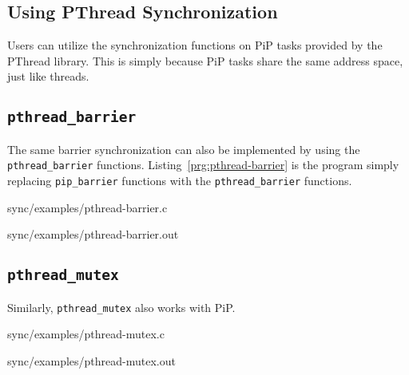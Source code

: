 \subsection{Using PThread Synchronization}

Users can utilize the synchronization functions on PiP tasks provided
by the PThread library. This is simply because PiP tasks share the
same address space, just like threads.

\subsection{\tt pthread_barrier}

The same barrier synchronization can also be implemented by using the
{\tt pthread_barrier} functions. 
Listing~\ref{prg:pthread-barrier} is the program simply replacing
{\tt pip_barrier} functions with the {\tt pthread_barrier} functions.


                {sync/examples/pthread-barrier.c}


                {sync/examples/pthread-barrier.out}
                
\subsection{\tt pthread_mutex}

Similarly, {\tt pthread_mutex} also works with PiP. 


                {sync/examples/pthread-mutex.c}


                {sync/examples/pthread-mutex.out}
